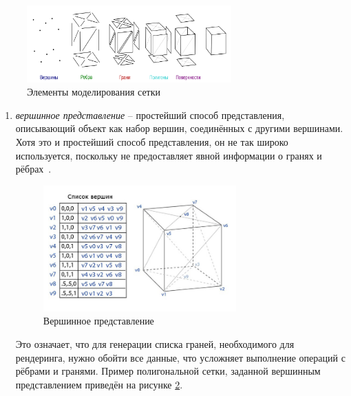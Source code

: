 \begin{figure}[h] 
	\centering
	\includegraphics[width=0.7\textwidth]{images/polygonal-models-example.png}
	\caption{Элементы моделирования сетки} 
	\label{fig:polygonal-models-example} 
\end{figure}

\begin{enumerate}
	\item \textit{вершинное представление} -- простейший способ представления, описывающий объект как набор вершин, соединённых с другими вершинами. Хотя это и простейший способ представления, он не так широко используется, поскольку не предоставляет явной информации о гранях и рёбрах~\cite{lit2}. 
	\begin{figure}[h] 
		\centering
		\includegraphics[width=0.7\textwidth]{images/vertex-list.png}
		\caption{Вершинное представление} 
		\label{fig:vertex-list} 
	\end{figure}
	Это означает, что для генерации списка граней, необходимого для рендеринга, нужно обойти все данные, что усложняет выполнение операций с рёбрами и гранями. Пример полигональной сетки, заданной вершинным представлением приведён на рисунке \ref{fig:vertex-list}.
	

\end{enumerate}
